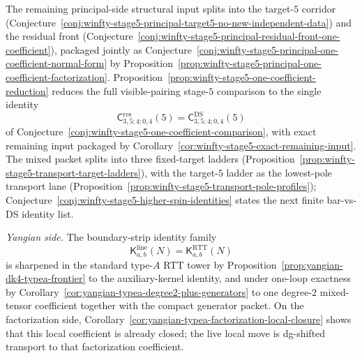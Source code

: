 \begin{proposition}
\begin{enumerate}[label=\textup{(\alph*)}]
  The remaining principal-side structural input splits into the
  target-$5$ corridor
  (Conjecture~\ref{conj:winfty-stage5-principal-target5-no-new-independent-data})
  and the residual front
  (Conjecture~\ref{conj:winfty-stage5-principal-residual-front-one-coefficient}),
  packaged jointly as
  Conjecture~\ref{conj:winfty-stage5-principal-one-coefficient-normal-form}
  by
  Proposition~\ref{prop:winfty-stage5-principal-one-coefficient-factorization}.
  Proposition~\ref{prop:winfty-stage5-one-coefficient-reduction}
  reduces the full visible-pairing stage-$5$ comparison to the single
  identity
  \[
  \mathsf{C}^{\mathrm{res}}_{3,5;4;0,4}(5)
  =
  \mathsf{C}^{\mathrm{DS}}_{3,5;4;0,4}(5)
  \]
  of Conjecture~\ref{conj:winfty-stage5-one-coefficient-comparison},
  with exact remaining input packaged by
  Corollary~\ref{cor:winfty-stage5-exact-remaining-input}.
  The mixed packet splits into three fixed-target ladders
  (Proposition~\ref{prop:winfty-stage5-transport-target-ladders}),
  with the target-$5$ ladder as the lowest-pole transport lane
  (Proposition~\ref{prop:winfty-stage5-transport-pole-profiles});
  Conjecture~\ref{conj:winfty-stage5-higher-spin-identities} states
  the next finite bar-vs-DS identity list.

  \emph{Yangian side.}
  The boundary-strip identity family
  \[
  \mathsf{K}^{\mathrm{line}}_{a,b}(N)
  =
  \mathsf{K}^{\mathrm{RTT}}_{a,b}(N)
  \]
  is sharpened in the standard type-$A$ RTT tower by
  Proposition~\ref{prop:yangian-dk4-typea-frontier} to the
  auxiliary-kernel identity, and under one-loop exactness by
  Corollary~\ref{cor:yangian-typea-degree2-plus-generators} to one
  degree-$2$ mixed-tensor coefficient together with the compact
  generator packet.  On the factorization side,
  Corollary~\ref{cor:yangian-typea-factorization-local-closure}
  shows that this local coefficient is already closed; the live
  local move is dg-shifted transport to that factorization coefficient.


\end{enumerate}
\end{proposition}
